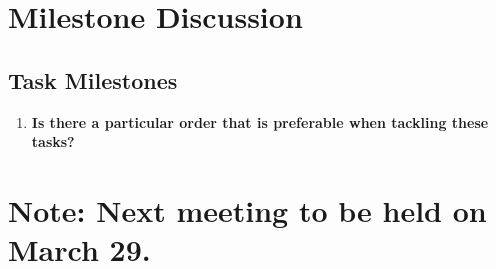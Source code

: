 \documentclass[10pt,english, a4paper]{article}
\begin{document}
\section{{ Milestone Discussion}}

\subsection{{ Task Milestones}}

\begin{enumerate}
\item \textbf{Is there a particular order that is preferable when tackling these tasks?}{\par}
\end{enumerate}

\section*{{Note: Next meeting to be held on March 29.}}
\end{document}

